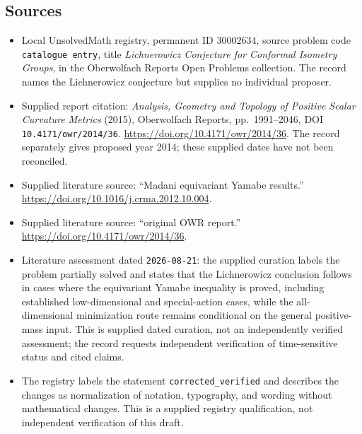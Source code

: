 \documentclass[11pt]{article}
\begin{document}
\subsection{Sources}
\begin{itemize}
\item Local UnsolvedMath registry, permanent ID \(30002634\), source problem code \texttt{catalogue entry}, title \emph{Lichnerowicz Conjecture for Conformal Isometry Groups}, in the Oberwolfach Reports Open Problems collection. The record names the Lichnerowicz conjecture but supplies no individual proposer.
\item Supplied report citation: \emph{Analysis, Geometry and Topology of Positive Scalar Curvature Metrics} (2015), Oberwolfach Reports, pp.\ 1991--2046, DOI \texttt{10.4171/owr/2014/36}. \url{https://doi.org/10.4171/owr/2014/36}. The record separately gives proposed year 2014; these supplied dates have not been reconciled.
\item Supplied literature source: ``Madani equivariant Yamabe results.'' \url{https://doi.org/10.1016/j.crma.2012.10.004}.
\item Supplied literature source: ``original OWR report.'' \url{https://doi.org/10.4171/owr/2014/36}.
\item Literature assessment dated \texttt{2026-08-21}: the supplied curation labels the problem partially solved and states that the Lichnerowicz conclusion follows in cases where the equivariant Yamabe inequality is proved, including established low-dimensional and special-action cases, while the all-dimensional minimization route remains conditional on the general positive-mass input. This is supplied dated curation, not an independently verified assessment; the record requests independent verification of time-sensitive status and cited claims.
\item The registry labels the statement \texttt{corrected\_verified} and describes the changes as normalization of notation, typography, and wording without mathematical changes. This is a supplied registry qualification, not independent verification of this draft.
\end{itemize}
\end{document}
